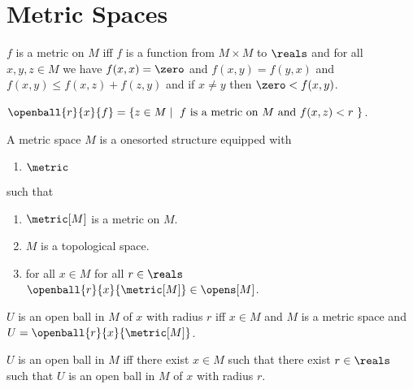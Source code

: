 



\section{Metric Spaces}

\begin{definition}\label{metric}
    $f$ is a metric on $M$ iff $f$ is a function from $M \times M$ to $\reals$ and
    for all $x,y,z \in M$ we have 
        $f(x,x) = \zero$ and 
        $f(x,y) = f(y,x)$ and
        $f(x,y) \leq f(x,z) + f(z,y)$ and
        if $x \neq y$ then $\zero < f(x,y)$.
\end{definition}

\begin{definition}\label{open_ball}
    $\openball{r}{x}{f} = \{z \in M \mid \text{ $f$ is a metric on $M$ and $f(x,z) < r$ } \}$.
\end{definition}



\begin{struct}\label{metric_space}  
    A metric space $M$ is a onesorted structure equipped with
    \begin{enumerate}
        \item $\metric$
    \end{enumerate}
    such that
    \begin{enumerate}
        \item \label{metric_space_metric}                   $\metric[M]$ is a metric on $M$.
        \item \label{metric_space_topology}                 $M$ is a topological space.
        \item \label{metric_space_opens}                    for all $x \in M$ for all $r \in \reals$ $\openball{r}{x}{\metric[M]} \in \opens[M]$.
    \end{enumerate}
\end{struct}

\begin{abbreviation}\label{descriptive_syntax_for_openball1}
    $U$ is an open ball in $M$ of $x$ with radius $r$ iff $x \in M$ and $M$ is a metric space and $U = \openball{r}{x}{\metric[M]}$.
\end{abbreviation}

\begin{abbreviation}\label{descriptive_syntax_for_openball2}
    $U$ is an open ball in $M$ iff there exist $x \in M$ such that there exist $r \in \reals$ such that $U$ is an open ball in $M$ of $x$ with radius $r$.
\end{abbreviation}

